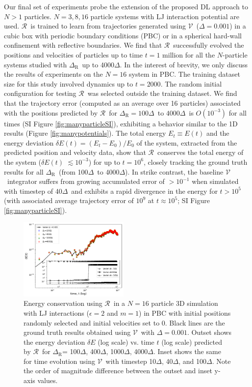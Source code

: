 \documentclass[aps,prl,twocolumn,superscriptaddress,tightenlines,longbibliography, reprint]{revtex4-1}
\newcommand{\dt}{$\Delta$}
\newcommand{\dtR}{$\Delta_{\textrm{R}}$}
\newcommand{\R}{$\mathscr{R}$}
\newcommand{\V}{$\mathscr{V}$}
\begin{document}
Our final set of experiments probe the extension of the proposed DL approach to $N>1$ particles. $N=3,8,16$ particle systems with LJ interaction potential are used. \R\ is trained to learn from trajectories generated using \V\ ($\Delta=0.001$) in a cubic box with periodic boundary conditions (PBC) or in a spherical hard-wall confinement with reflective boundaries. 
We find that \R\ successfully evolved the positions and velocities of particles up to time $t = 1$ million for all the $N$-particle systems studied with \dtR\ up to 4000\dt.
In the interest of brevity, we only discuss the results of experiments on the $N=16$ system in PBC. The training dataset size for this study involved
dynamics up to $t=2000$. The random initial configuration for testing \R\ was selected outside the training dataset.
We find that the trajectory error (computed as an average over 16 particles) associated with the positions predicted by \R\ for \dtR$=100$\dt\ to $4000$\dt\ is $O(10^{-3})$ for all times (SI Figure \ref{fig:manyparticleSI}), exhibiting a behavior similar to the 1D results (Figure \ref{fig:manypotentials}).
The total energy $E_t \equiv E(t)$ and the energy deviation $\delta E(t) = (E_t-E_0)/E_0$ of the system, extracted from the predicted position and velocity data, show that \R\ conserves the total energy of the system ($\delta E(t)$ $\lesssim 10^{-3}$) for up to $t=10^6$, closely tracking the ground truth results for all \dtR\ (from 100\dt\ to 4000\dt). In strike contrast, the baseline \V\ integrator suffers from growing accumulated error of $>10^{-1}$ when simulated with timestep of 40\dt\ and exhibits a rapid divergence in the energy for $t>10^5$ (with associated average trajectory error of $10^9$ at $t\approx10^5$; SI Figure \ref{fig:manyparticleSI}).

\begin{figure}[htb]
\centering
\includegraphics[width=0.48\textwidth]{figures/fig5.png}
\caption{Energy conservation using \R\ in a $N=16$ particle 3D simulation with LJ interactions ($\epsilon=2$ and $m=1$) in PBC with initial positions randomly selected and initial velocities set to 0. Black lines are the ground truth results obtained using \V\ with $\Delta=0.001$. Outset shows the energy deviation $\delta E$ (log scale) vs. time $t$ (log scale) predicted by \R\ for \dtR = 100\dt, 400\dt, 1000\dt, 4000\dt. Inset shows the same for time evolution using \V\ with timestep 10\dt, 40\dt, and 100\dt. Note the order of magnitude difference between the outset and inset y-axis values. 
}
\label{fig:manyparticle}
\end{figure}
\end{document}
